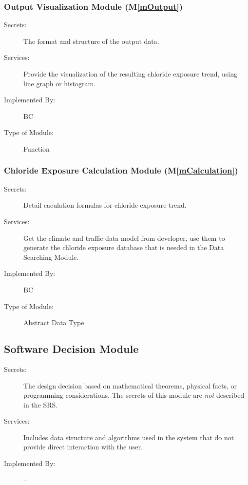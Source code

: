 \documentclass[12pt, titlepage]{article}
\newcommand{\mref}[1]{M\ref{#1}}
\begin{document}
\subsubsection{Output Visualization Module (\mref{mOutput})}
\begin{description}
\item[Secrets:] The format and structure of the output data.
\item[Services:] Provide the visualization of the resulting chloride exposure trend, using line graph or histogram. 
\item[Implemented By:] BC
\item[Type of Module:] Function
\end{description}

\subsubsection{Chloride Exposure Calculation Module (\mref{mCalculation})}
\begin{description}
\item[Secrets:] Detail caculation formulas for chloride exposure trend.
\item[Services:] Get the climate and traffic data model from developer, use them to generate the chloride exposure database that is needed in the Data Searching Module.
\item[Implemented By:] BC
\item[Type of Module:] Abstract Data Type
\end{description}

\subsection{Software Decision Module}

\begin{description}
\item[Secrets:] The design decision based on mathematical theorems, physical
  facts, or programming considerations. The secrets of this module are
  \emph{not} described in the SRS.
\item[Services:] Includes data structure and algorithms used in the system that
  do not provide direct interaction with the user. 
\item[Implemented By:] --
\end{description}
\end{document}
